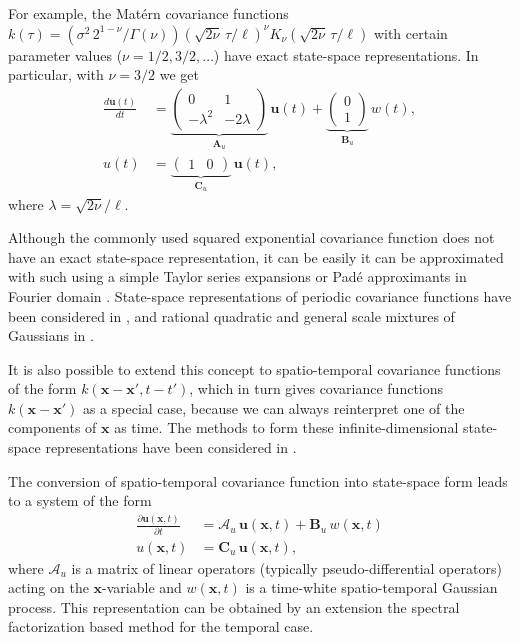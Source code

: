 \documentclass[journal]{IEEEtran}
\begin{document}
For example, the Mat\'ern covariance functions  $k(\tau) = \left( \sigma^2 \, 2^{1-\nu} / \Gamma(\nu)\right) \left(\sqrt{2\nu}\,\tau / \ell \right)^\nu K_\nu\left(\sqrt{2\nu}\,\tau / \ell \right)$ with certain parameter values ($\nu=1/2,3/2,\ldots$) have exact state-space representations. In particular, with $\nu=3/2$ we get
\begin{equation}
\begin{split}
\frac{d\mathbf{u}(t)}{dt} &= \underbrace{\begin{pmatrix} 0 & 1 \\ -\lambda^2 & -2\lambda \end{pmatrix}}_{\mathbf{A}_u}
 \, \mathbf{u}(t)
+ \underbrace{\begin{pmatrix} 0 \\ 1 \end{pmatrix}}_{\mathbf{B}_u} \, w(t), \\
   u(t) &= \underbrace{\begin{pmatrix} 1 & 0 \end{pmatrix}}_{\mathbf{C}_u} \, \mathbf{u}(t),
\end{split}
\end{equation}
%
where $\lambda=\sqrt{2\nu}/\ell$. 

Although the commonly used squared exponential covariance function does not have an exact state-space representation, it can be easily it can be approximated with such using a simple Taylor series expansions or Pad\'e approximants in Fourier domain \cite{Sarkka+Piche:2014}. State-space representations of periodic covariance functions have been considered in \cite{Solin+Sarkka:2014a}, and rational quadratic and general scale mixtures of Gaussians in \cite{Solin+Sarkka:2014b}.

It is also possible to extend this concept to spatio-temporal covariance functions of the form $k(\mathbf{x} - \mathbf{x}', t-t')$, which in turn gives covariance functions $k(\mathbf{x} - \mathbf{x}')$ as a special case, because we can always reinterpret one of the components of $\mathbf{x}$ as time. The methods to form these infinite-dimensional state-space representations have been considered in \cite{Sarkka+Hartikainen:2012,Sarkka+Solin+Hartikainen:2013}. 

The conversion of spatio-temporal covariance function into state-space form leads to a system of the form
%
\begin{equation}
\begin{split}
  \frac{\partial\mathbf{u}(\mathbf{x},t)}{\partial t} &= \mathbf{\mathcal{A}}_u \, \mathbf{u}(\mathbf{x},t)
  + \mathbf{B}_u \, w(\mathbf{x},t) \\
   u(\mathbf{x},t) &= \mathbf{C}_u \, \mathbf{u}(\mathbf{x},t),
\end{split}
\label{eq:ssu2}
\end{equation}
%
where $\mathbf{\mathcal{A}}_u$ is a matrix of linear operators (typically pseudo-differential operators) acting on the $\mathbf{x}$-variable and $w(\mathbf{x},t)$ is a time-white spatio-temporal Gaussian process. This representation can be obtained by an extension the spectral factorization based method for the temporal case. 
\end{document}

